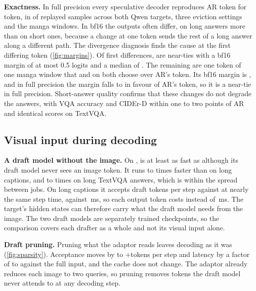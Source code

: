 \noindent\textbf{Exactness.}
In full precision every speculative decoder reproduces AR token for token, in \fpeAll of \fpqAll replayed samples across both Qwen targets, three eviction settings and the manga windows.
In bf16 the outputs often differ, on long answers more than on short ones, because a change at one token sends the rest of a long answer along a different path.
The divergence diagnosis finds the cause at the first differing token (\cref{fig:margins}).
Of \diagCasesAll first differences, \diagNearAll are near-ties with a bf16 margin of at most 0.5 logits and a median of \diagNearMedian.
The remaining \diagOtherAll are one token of one manga window that \vispec and \hivis on \qwenL both choose over AR's token.
Its bf16 margin is \diagBigBf, and in full precision the margin falls to \diagBigFp in favour of AR's token, so it is a near-tie in full precision.
Short-answer quality confirms that these changes do not degrade the answers, with VQA accuracy and CIDEr-D within one to two points of AR and identical scores on \qwenL TextVQA.

\subsection{Visual input during decoding}
\label{sec:visual}

\noindent{}\textbf{A draft model without the image.} 
On \qwenL, \hivis is at least as fast as \vispec although its draft model never sees an image token.
It runs \sbLongCocoHovMin to \sbLongCocoHovMax times faster than \vispec on long captions, and \sbLongTextvqaHovMin to \sbLongTextvqaHovMax times on long TextVQA answers, which is within the spread between jobs.
On long captions it accepts \sbLongCocoHivAccept draft tokens per step against \sbLongCocoVisAccept at nearly the same step time, \sbCocoHivStep against \sbCocoVisStep\,ms, so each output token costs \sbCocoHivTpot instead of \sbCocoVisTpot\,ms.
The target's hidden states can therefore carry what the draft model needs from the image.
The two draft models are separately trained checkpoints, so the comparison covers each drafter as a whole and not its visual input alone.



\noindent{}\textbf{Draft pruning.} 
Pruning what the \vispec adaptor reads leaves decoding as it was (\cref{fig:sparsity}).
Acceptance moves by \spDraftAccMin to +\spDraftAccMax tokens per step and latency by a factor of \spDraftLatMin to \spDraftLatMax against the full input, and the cache does not change.
The adaptor already reduces each image to two queries, so pruning removes tokens the draft model never attends to at any decoding step.

